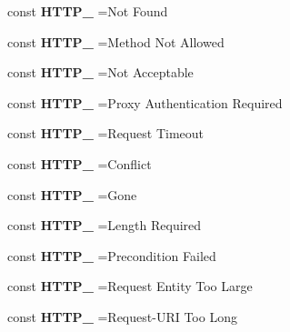 \begin{DoxyCompactItemize}
const {\bfseries H\+T\+T\+P\+\_} =\textquotesingle{}Not Found\textquotesingle{}
\item 
\hypertarget{class_base_ac8f37841b9501862ab4436188e6ef52c}{}\label{class_base_ac8f37841b9501862ab4436188e6ef52c} 
const {\bfseries H\+T\+T\+P\+\_} =\textquotesingle{}Method Not Allowed\textquotesingle{}
\item 
\hypertarget{class_base_ac89c0f949c653c14eabf66cf51914f7a}{}\label{class_base_ac89c0f949c653c14eabf66cf51914f7a} 
const {\bfseries H\+T\+T\+P\+\_} =\textquotesingle{}Not Acceptable\textquotesingle{}
\item 
\hypertarget{class_base_aa2744fa255e0fde11c39044a4f39218f}{}\label{class_base_aa2744fa255e0fde11c39044a4f39218f} 
const {\bfseries H\+T\+T\+P\+\_} =\textquotesingle{}Proxy Authentication Required\textquotesingle{}
\item 
\hypertarget{class_base_ad478a80358a910b447fe9a8f0fe3e5f3}{}\label{class_base_ad478a80358a910b447fe9a8f0fe3e5f3} 
const {\bfseries H\+T\+T\+P\+\_} =\textquotesingle{}Request Timeout\textquotesingle{}
\item 
\hypertarget{class_base_a14c4dd15ae82f4276945fe8ca3587425}{}\label{class_base_a14c4dd15ae82f4276945fe8ca3587425} 
const {\bfseries H\+T\+T\+P\+\_} =\textquotesingle{}Conflict\textquotesingle{}
\item 
\hypertarget{class_base_a6ecb7b05cfc5c946b48c517f4cd1eb1e}{}\label{class_base_a6ecb7b05cfc5c946b48c517f4cd1eb1e} 
const {\bfseries H\+T\+T\+P\+\_} =\textquotesingle{}Gone\textquotesingle{}
\item 
\hypertarget{class_base_a5fd3f7b58e313d50de57055da35b8c34}{}\label{class_base_a5fd3f7b58e313d50de57055da35b8c34} 
const {\bfseries H\+T\+T\+P\+\_} =\textquotesingle{}Length Required\textquotesingle{}
\item 
\hypertarget{class_base_ab3afa21eeb61eec4bec88e01faa33a83}{}\label{class_base_ab3afa21eeb61eec4bec88e01faa33a83} 
const {\bfseries H\+T\+T\+P\+\_} =\textquotesingle{}Precondition Failed\textquotesingle{}
\item 
\hypertarget{class_base_a45f0b1f7c9cf100d85d99d35122be993}{}\label{class_base_a45f0b1f7c9cf100d85d99d35122be993} 
const {\bfseries H\+T\+T\+P\+\_} =\textquotesingle{}Request Entity Too Large\textquotesingle{}
\item 
\hypertarget{class_base_a3bc4a9f6ae41b35db4ef4cb6c3c81dc0}{}\label{class_base_a3bc4a9f6ae41b35db4ef4cb6c3c81dc0} 
const {\bfseries H\+T\+T\+P\+\_} =\textquotesingle{}Request-\/U\+RI Too Long\textquotesingle{}

\end{DoxyCompactItemize}
